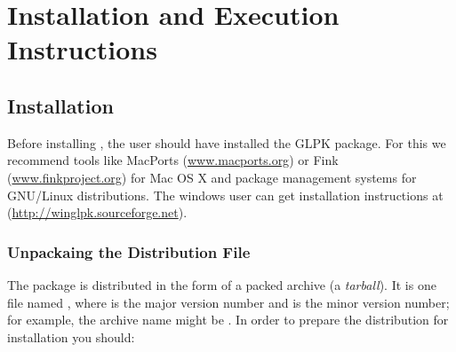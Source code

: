 
\chapter{Installation and Execution Instructions}
\label{chap_2}


\section{Installation}
\label{sec_2_1}
Before installing \pump{}, the user should have installed the GLPK package. For this we recommend tools like MacPorts (\url{www.macports.org}) or Fink (\url{www.finkproject.org}) for Mac OS X and package management systems for GNU/Linux distributions. The windows user can get installation instructions at (\url{http://winglpk.sourceforge.net}). 


\subsection{Unpackaing the Distribution File}
\label{sec_2_1_1}
The \pump{} package is distributed in the form of a packed archive (a \textit{tarball}). It is one file named , where  is the major version number and  is the minor version number; for example, the archive name might be . In order to prepare the distribution for installation you should:

